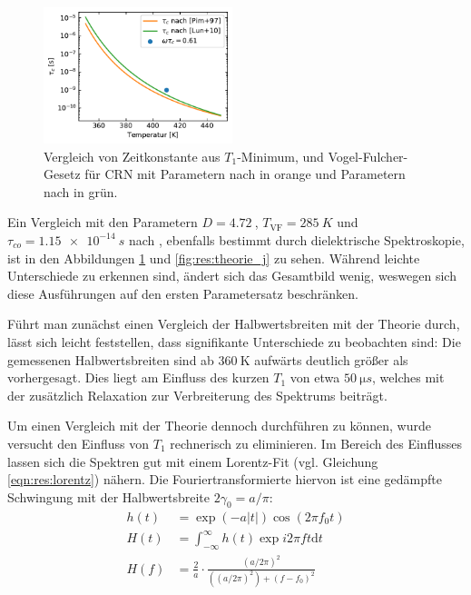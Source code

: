 \begin{figure}
	\vspace{-20pt}
	\begin{center}
		\includegraphics[width=0.49\textwidth]{graphics/plot/vftau.pdf}
	\end{center}
	\vspace{-20pt}
	\caption{Vergleich von Zeitkonstante aus $T_1$-Minimum, und Vogel-Fulcher-Gesetz für CRN mit Parametern nach \cite{PIMENOV199793} in orange und Parametern nach \cite{crn_augsburg} in grün. \label{fig:korrelationszeiten}}
\end{figure}
Ein Vergleich mit den Parametern $D = \SI{4.72}{}$, $T_\text{VF} = \SI{285}{K}$ und $\tau_{co} = \SI{1.15e-14}{s}$ nach \cite{crn_augsburg}, ebenfalls bestimmt durch dielektrische Spektroskopie, ist in den Abbildungen \ref{fig:korrelationszeiten} und \ref{fig:res:theorie_j} zu sehen. Während leichte Unterschiede zu erkennen sind, ändert sich das Gesamtbild wenig, weswegen sich diese Ausführungen auf den ersten Parametersatz beschränken.




Führt man zunächst einen Vergleich der Halbwertsbreiten mit der Theorie durch, lässt sich leicht feststellen, dass signifikante Unterschiede zu beobachten sind: Die gemessenen Halbwertsbreiten sind ab $\SI{360}{\kelvin}$ aufwärts deutlich größer als vorhergesagt. Dies liegt am Einfluss des kurzen $T_1$ von etwa $\SI{50}{\micro s}$, welches mit der zusätzlich Relaxation zur Verbreiterung des Spektrums beiträgt.

Um einen Vergleich mit der Theorie dennoch durchführen zu können, wurde versucht den Einfluss von $T_1$ rechnerisch zu eliminieren. Im Bereich des Einflusses lassen sich die Spektren gut mit einem Lorentz-Fit (vgl. Gleichung \eqref{eqn:res:lorentz}) nähern. Die Fouriertransformierte hiervon ist eine gedämpfte Schwingung mit der Halbwertsbreite $2 \gamma_0 = a/\pi$:
\begin{align}
	h(t) & = \exp{(-a |t|)} \cos{(2 \pi f_0 t)} \\
	H(t) & = \int_{-\infty}^{\infty} h(t) \exp{i 2 \pi f t} \text{d} t \\
	H(f) & = \frac{2}{a} \cdot \frac{(a/2\pi)^2}{((a/2\pi)^2) + (f - f_0)^2}
\end{align}


